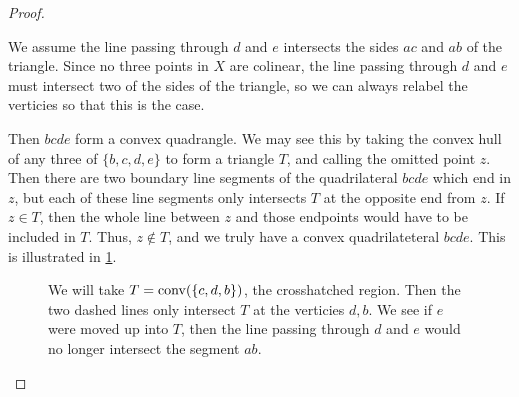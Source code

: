 \begin{proof}
\begin{marginfigure}
\begin{center}
\end{center}
\caption{We assume the line passing through $d$ and $e$ intersects the sides $ac$ and $ab$ of the triangle. Since no three points in $X$ are colinear, the line passing through $d$ and $e$ must intersect two of the sides of the triangle, so we can always relabel the verticies so that this is the case.} \label{fig:lem89de_line}
\end{marginfigure} Then $bcde$ form a convex quadrangle. We may see this by taking the convex hull of any three of $\{b,c,d,e\}$ to form a triangle $T$, and calling the omitted point $z$. Then there are two boundary line segments of the quadrilateral $bcde$ which end in $z$, but each of these line segments only intersects $T$ at the opposite end from $z$. If $z\in T$, then the whole line between $z$ and those endpoints would have to be included in $T$. Thus, $z\not \in T$, and we truly have a convex quadrilateteral $bcde$. This is illustrated in \cref{fig:lem89T}.
\begin{figure}
\begin{center}
\end{center}
\caption{We will take $T= \operatorname{conv}(\{c,d,b\})$, the crosshatched region. Then the two dashed lines only intersect $T$ at the verticies $d,b$. We see if $e$ were moved up into $T$, then the line passing through $d$ and $e$ would no longer intersect the segment $ab$.} \label{fig:lem89T}
\end{figure}
\end{proof}
